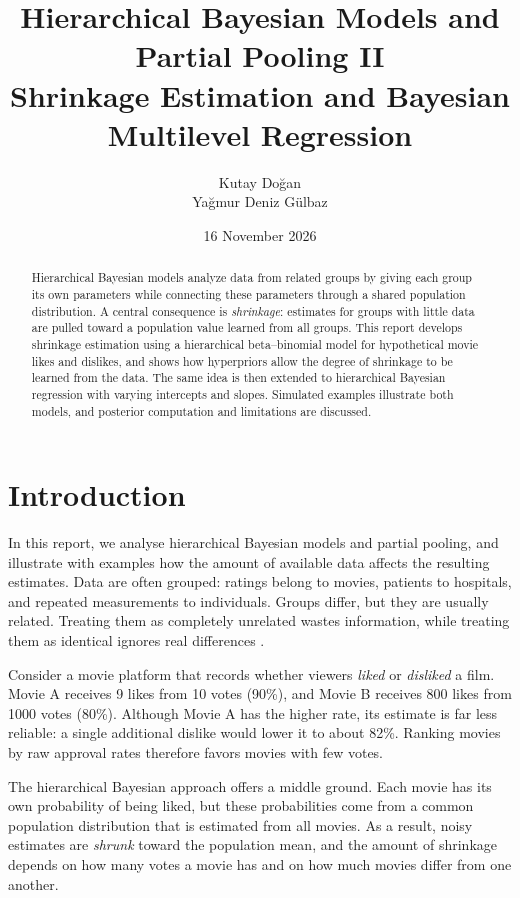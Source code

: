 \documentclass[11pt,a4paper]{article}
\title{\textbf{Hierarchical Bayesian Models and Partial Pooling II}\\[0.3em]
\large Shrinkage Estimation and Bayesian Multilevel Regression}
\author{Kutay Doğan \\ Yağmur Deniz Gülbaz}
\date{16 November 2026}
\begin{document}
\maketitle
\vspace{-1.7em}

\begin{abstract}
Hierarchical Bayesian models analyze data from related groups by giving each group its own parameters while connecting these parameters through a shared population distribution. A central consequence is \emph{shrinkage}: estimates for groups with little data are pulled toward a population value learned from all groups. This report develops shrinkage estimation using a hierarchical beta--binomial model for hypothetical movie likes and dislikes, and shows how hyperpriors allow the degree of shrinkage to be learned from the data. The same idea is then extended to hierarchical Bayesian regression with varying intercepts and slopes. Simulated examples illustrate both models, and posterior computation and limitations are discussed.
\end{abstract}

\section{Introduction}
In this report, we analyse hierarchical Bayesian models and partial pooling, and illustrate with examples how the amount of available data affects the resulting estimates. Data are often grouped: ratings belong to movies, patients to hospitals, and repeated measurements to individuals. Groups differ, but they are usually related. Treating them as completely unrelated wastes information, while treating them as identical ignores real differences \cite{gelmanhill2007,gelmanetal2013}.

Consider a movie platform that records whether viewers \emph{liked} or \emph{disliked} a film. Movie A receives 9 likes from 10 votes (90\%), and Movie B receives 800 likes from 1000 votes (80\%). Although Movie A has the higher rate, its estimate is far less reliable: a single additional dislike would lower it to about 82\%. Ranking movies by raw approval rates therefore favors movies with few votes.

The hierarchical Bayesian approach offers a middle ground. Each movie has its own probability of being liked, but these probabilities come from a common population distribution that is estimated from all movies. As a result, noisy estimates are \emph{shrunk} toward the population mean, and the amount of shrinkage depends on how many votes a movie has and on how much movies differ from one another.
\end{document}
